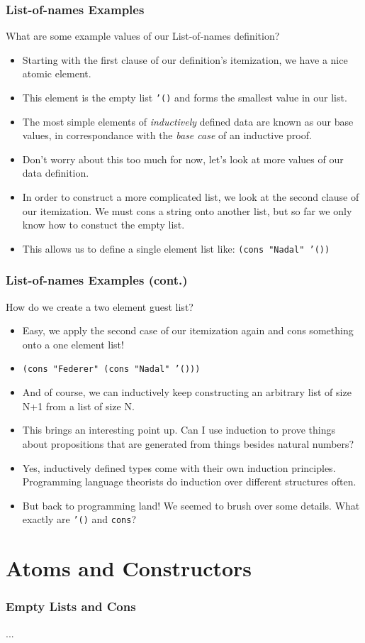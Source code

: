 \documentclass{beamer}
\begin{document}
\begin{frame}
  \frametitle{List-of-names Examples}
  What are some example values of our List-of-names definition?
  \begin{itemize}
  \item<2-> Starting with the first clause of our definition's itemization,
    we have a nice atomic element.
  \item<3-> This element is the empty list \texttt{'()} and forms the smallest  value in our list.
  \item<4-> The most simple elements of \emph{inductively} defined data are known
    as our base values, in correspondance with the \emph{base case} of an
    inductive proof.
  \item<5-> Don't worry about this too much for now, let's look
    at more values of our data definition.
  \item<6-> In order to construct a more complicated list, we look at the second clause of our itemization. We must cons a string
    onto another list, but so far we only know how to constuct the empty list.
  \item<7-> This allows us to define a single element list like:
    \texttt{(cons "Nadal" '())}
  \end{itemize}
\end{frame}

\begin{frame}
  \frametitle{List-of-names Examples (cont.)}
  How do we create a two element guest list?
  \begin{itemize}
  \item<2-> Easy, we apply the second case of our itemization again and cons something onto a one element list!
  \item<3-> \texttt{(cons "Federer" (cons "Nadal" '()))}
  \item<4-> And of course, we can inductively keep constructing an arbitrary
    list of size N+1 from a list of size N.
  \item<5-> This brings an interesting point up. Can I use induction to prove
    things about propositions that are generated from things besides natural numbers?
  \item<6-> Yes, inductively defined types come with their own induction principles. Programming language theorists do induction over different structures often.
  \item<7-> But back to programming land! We seemed to brush over some details.
    What exactly are \texttt{'()} and \texttt{cons}?
  \end{itemize}
\end{frame}

\section{Atoms and Constructors}
\begin{frame}
  \frametitle{Empty Lists and Cons}
  ...
\end{frame}
\end{document}
